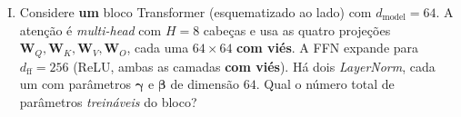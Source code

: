 \documentclass{dlproblemset}
\begin{document}
\begin{enumerate}[I)]
\begin{enumerate}[a)]
    \item $\mathbf{Q}_i$: $10 \times 512$; \quad $\mathbf{Q}_i \mathbf{K}_i^\top$: $10 \times 10$; \quad saída: $10 \times 512$.
    \item $\mathbf{Q}_i$: $10 \times 64$; \quad $\mathbf{Q}_i \mathbf{K}_i^\top$: $64 \times 64$; \quad saída: $10 \times 512$.
    \item $\mathbf{Q}_i$: $10 \times 64$; \quad $\mathbf{Q}_i \mathbf{K}_i^\top$: $10 \times 10$; \quad saída: $10 \times 64$.
    \item $\mathbf{Q}_i$: $64 \times 64$; \quad $\mathbf{Q}_i \mathbf{K}_i^\top$: $10 \times 10$; \quad saída: $10 \times 512$.
    \item $\mathbf{Q}_i$: $10 \times 64$; \quad $\mathbf{Q}_i \mathbf{K}_i^\top$: $8 \times 8$; \quad saída: $10 \times 512$.
    \item $\mathbf{Q}_i$: $10 \times 64$; \quad $\mathbf{Q}_i \mathbf{K}_i^\top$: $10 \times 10$; \quad saída: $10 \times 512$.
    \item $\mathbf{Q}_i$: $10 \times 8$; \quad $\mathbf{Q}_i \mathbf{K}_i^\top$: $10 \times 10$; \quad saída: $10 \times 512$.
    \item $\mathbf{Q}_i$: $10 \times 64$; \quad $\mathbf{Q}_i \mathbf{K}_i^\top$: $10 \times 10$; \quad saída: $512 \times 512$.
\end{enumerate}

\item Considere \textbf{um} bloco Transformer (esquematizado ao lado) com $d_{\text{model}} = 64$. A atenção é \textit{multi-head} com $H = 8$ cabeças e usa as quatro projeções $\mathbf{W}_Q, \mathbf{W}_K, \mathbf{W}_V, \mathbf{W}_O$, cada uma $64 \times 64$ \textbf{com viés}. A FFN expande para $d_{\text{ff}} = 256$ (ReLU, ambas as camadas \textbf{com viés}). Há dois \textit{LayerNorm}, cada um com parâmetros $\boldsymbol{\gamma}$ e $\boldsymbol{\beta}$ de dimensão $64$. Qual o número total de parâmetros \emph{treináveis} do bloco?


\end{enumerate}
\end{document}
